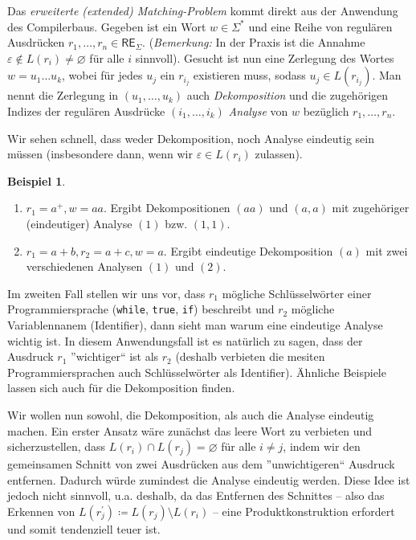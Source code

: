 \documentclass[11pt, a4paper]{article}
\theoremstyle{definition}
\newtheorem{example}[definition]{Beispiel}
\theoremstyle{plain}
\numberwithin{equation}{section}
\let\emptyset\varnothing
\begin{document}
Das \textit{erweiterte (extended) Matching-Problem} kommt direkt aus der Anwendung des Compilerbaus. Gegeben ist ein Wort \( w \in \Sigma^\ast \) und eine Reihe von regulären Ausdrücken \( r_1, \ldots, r_n \in \mathsf{RE}_\Sigma \). (\textit{Bemerkung:} In der Praxis ist die Annahme \( \varepsilon \notin L(r_i) \neq \emptyset \) für alle \( i \) sinnvoll). Gesucht ist nun eine Zerlegung des Wortes \( w = u_1 \ldots u_k \), wobei für jedes \( u_j \) ein \( r_{i_j} \) existieren muss, sodass \( u_j \in L(r_{i_j}) \). Man nennt die Zerlegung in \( (u_1, \ldots, u_k) \) auch \textit{Dekomposition} und die zugehörigen Indizes der regulären Ausdrücke \( (i_1, \ldots, i_k) \) \textit{Analyse} von \( w \) bezüglich \( r_1, \ldots, r_n \).

Wir sehen schnell, dass weder Dekomposition, noch Analyse eindeutig sein müssen (insbesondere dann, wenn wir \( \varepsilon \in L(r_i) \) zulassen).
\begin{example}
	\begin{enumerate}
		\item \( r_1 = a^+, w = aa \). Ergibt Dekompositionen \( (aa) \) und \( (a, a) \) mit zugehöriger (eindeutiger) Analyse \( (1) \) bzw. \( (1, 1) \).
		\item \( r_1 = a+b, r_2 = a+c, w = a \). Ergibt eindeutige Dekomposition \( (a) \) mit zwei verschiedenen Analysen \( (1) \) und \( (2) \).	
	\end{enumerate}
	Im zweiten Fall stellen wir uns vor, dass \( r_1 \) mögliche Schlüsselwörter einer Programmiersprache (\texttt{while}, \texttt{true}, \texttt{if}) beschreibt und \( r_2 \) mögliche Variablennanem (Identifier), dann sieht man warum eine eindeutige Analyse wichtig ist. In diesem Anwendungsfall ist es natürlich zu sagen, dass der Ausdruck \( r_1 \) ''wichtiger`` ist als \( r_2 \) (deshalb verbieten die mesiten Programmiersprachen auch Schlüsselwörter als Identifier). Ähnliche Beispiele lassen sich auch für die Dekomposition finden.
\end{example}

Wir wollen nun sowohl, die Dekomposition, als auch die Analyse eindeutig machen. Ein erster Ansatz wäre zunächst das leere Wort zu verbieten und sicherzustellen, dass \( L(r_i) \cap L(r_j) = \emptyset \) für alle \( i \neq j \), indem wir den gemeinsamen Schnitt von zwei Ausdrücken aus dem ''unwichtigeren`` Ausdruck entfernen. Dadurch würde zumindest die Analyse eindeutig werden. Diese Idee ist jedoch nicht sinnvoll, u.a. deshalb, da das Entfernen des Schnittes -- also das Erkennen von \( L(r_j^\prime) \coloneqq L(r_j) \setminus L(r_i) \) -- eine Produktkonstruktion erfordert und somit tendenziell teuer ist.
\end{document}
